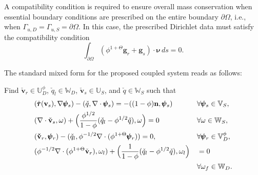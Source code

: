 A compatibility condition is required to ensure overall mass conservation when essential boundary conditions 
are prescribed on the entire boundary $\partial \Omega$, i.e., when $\Gamma_{u,D} = \Gamma_{u,S} = \partial \Omega$. 
In this case, the prescribed Dirichlet data must satisfy the compatibility condition
\begin{equation}
		  \int_{\partial \Omega} (\phi^{1+\Theta}\mathbf{g}_r + \mathbf{g}_s) \cdot \pmb{\nu}\, ds = 0.
\end{equation}

The standard mixed form for the proposed coupled system reads as follows:

Find $\check{\mathbf{v}}_r \in \mathbb{U}^{\phi}_D$,
$\check{q}_l \in \mathbb{W}_D$, $\check{\mathbf{v}}_s \in \mathbb{U}_S$, and $\check{q}\in \mathbb{W}_S$ such that
\begin{alignat}{2}
		  \label{eq:weak_coupled_1}
		  &(\check{\pmb{\tau}}(\bold{v}_{s}),\nabla \pmb{\psi}_s) - (\check{q}, \nabla \cdot \pmb{\psi}_s) = -((1-\phi)\bold{n}, \pmb{\psi}_s) &&\forall\pmb{\psi}_s \in \mathbb{V}_S,\\
		  \label{eq:weak_coupled_2}
					 &(\nabla \cdot \check{\bold{v}}_{s}, \omega)  + \Big(\frac{\phi^{1/2}}{1-\phi} (\check{q}_l - \phi^{1/2}\check{q}), \omega\Big) = 0 &&\forall \omega \in \mathbb{W}_S,\\
					 \label{eq:weak_coupled_3}
					 &(\bold{\check{v}}_{r},\pmb{\psi}_r)  - (\check{q}_{l},\phi^{-1/2} \nabla \cdot (\phi^{1+\Theta}\pmb{\psi}_r)) = 0, &&\forall \pmb{\psi}_r \in \mathbb{V}_D^\phi,\\
					 \nonumber
					 &(\phi^{-1/2} \nabla \cdot (\phi^{1+\Theta}\check{\bold{v}}_r),\omega_l) + \Big(\frac{1}{1-\phi}(\check{q}_{l} - \phi^{1/2}\check{q}),\omega_l \Big) &&= 0 \\
					 \label{eq:weak_coupled_4}
		  &					 &&\forall \omega_f \in 
		  \mathbb{W}_D.
\end{alignat}

